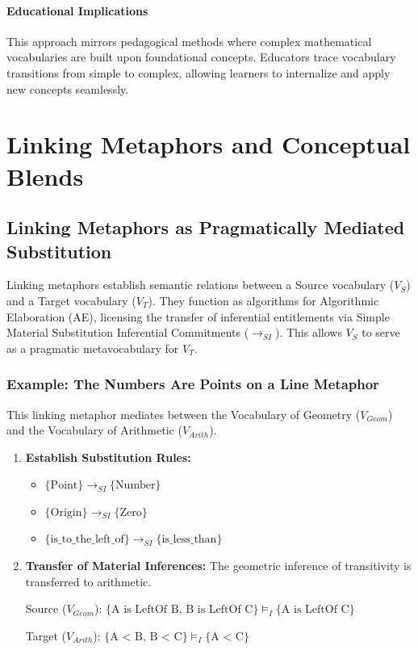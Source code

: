 \documentclass[12pt]{book}
\begin{document}
\paragraph{Educational Implications}

This approach mirrors pedagogical methods where complex mathematical vocabularies are built upon foundational concepts. Educators trace vocabulary transitions from simple to complex, allowing learners to internalize and apply new concepts seamlessly.


\section{Linking Metaphors and Conceptual Blends}

\subsection{Linking Metaphors as Pragmatically Mediated Substitution}

Linking metaphors establish semantic relations between a Source vocabulary ($V_{S}$) and a Target vocabulary ($V_{T}$). They function as algorithms for Algorithmic Elaboration (AE), licensing the transfer of inferential entitlements via Simple Material Substitution Inferential Commitments ($\rightarrow_{SI}$). This allows $V_{S}$ to serve as a pragmatic metavocabulary for $V_{T}$.

\subsubsection{Example: The Numbers Are Points on a Line Metaphor}

This linking metaphor mediates between the Vocabulary of Geometry ($V_{Geom}$) and the Vocabulary of Arithmetic ($V_{Arith}$).

\begin{enumerate}
    \item \textbf{Establish Substitution Rules:}
    \begin{itemize}
        \item $\{\text{Point}\} \rightarrow_{SI} \{\text{Number}\}$
        \item $\{\text{Origin}\} \rightarrow_{SI} \{\text{Zero}\}$
        \item $\{\text{is\_to\_the\_left\_of}\} \rightarrow_{SI} \{\text{is\_less\_than}\}$
    \end{itemize}

    \item \textbf{Transfer of Material Inferences:}
    The geometric inference of transitivity is transferred to arithmetic.
    
    Source ($V_{Geom}$): 
    $\{\text{A is LeftOf B, B is LeftOf C}\} \models_{I} \{\text{A is LeftOf C}\}$
    
    Target ($V_{Arith}$):
    $\{\text{A < B, B < C}\} \models_{I} \{\text{A < C}\}$

\end{enumerate}
\end{document}
